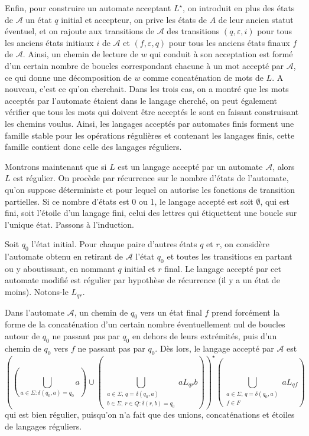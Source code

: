 \begin{preuve}
Enfin, pour construire un automate acceptant $L^\star$, on introduit en plus des états de $\mathcal{A}$ un état $q$ initial et accepteur, on prive les états de $A$ de leur ancien statut éventuel, et on rajoute aux transitions de $\mathcal{A}$ des transitions $(q,\varepsilon,i)$ pour tous les anciens états initiaux $i$ de $\mathcal{A}$ et $(f,\varepsilon,q)$ pour tous les anciens états finaux $f$ de $\mathcal{A}$. Ainsi, un chemin de lecture de $w$ qui conduit à son acceptation est formé d'un certain nombre de boucles correspondant chacune à un mot accepté par $\mathcal{A}$, ce qui donne une décomposition de $w$ comme concaténation de mots de $L$. A nouveau, c'est ce qu'on cherchait. Dans les trois cas, on a montré que les mots acceptés par l'automate étaient dans le langage cherché, on peut également vérifier que tous les mots qui doivent être acceptés le sont en faisant construisant les chemins voulus.
Ainsi, les langages acceptés par automates finis forment une famille stable pour les opérations régulières et contenant les langages finis, cette famille contient donc celle des langages réguliers.

Montrons maintenant que si $L$ est un langage accepté par un automate $\mathcal{A}$, alors $L$ est régulier. On procède par récurrence sur le nombre d'états de l'automate, qu'on suppose déterministe et pour lequel on autorise les fonctions de transition partielles. Si ce nombre d'états est 0 ou 1, le langage accepté est soit $\emptyset$, qui est fini, soit l'étoile d'un langage fini, celui des lettres qui étiquettent une boucle sur l'unique état. Passons à l'induction.

Soit $q_0$ l'état initial. Pour chaque paire d'autres états $q$ et $r$, on considère l'automate obtenu en retirant de $\mathcal{A}$ l'état $q_0$ et toutes les transitions en partant ou y aboutissant, en nommant $q$ initial et $r$ final. Le langage accepté par cet automate modifié est régulier par hypothèse de récurrence (il y a un état de moins). Notons-le $L_{qr}$.

Dans l'automate $\mathcal{A}$, un chemin de $q_0$ vers un état final $f$ prend forcément la forme de la  concaténation d'un certain nombre éventuellement nul de boucles autour de $q_0$ ne passant pas par $q_0$ en dehors de leurs extrémités, puis d'un chemin de $q_0$ vers $f$ ne passant pas par $q_0$. Dès lors, le langage accepté par $\mathcal{A}$ est
\[
\left( (\bigcup_{a\in\Sigma : \delta(q_0,a)=q_0} a) \cup
(\bigcup_{\substack{a\in\Sigma,\,q=\delta(q_0,a)\\ b\in \Sigma,\, r\in Q: \delta(r,b)=q_0}} aL_{qr}b)
\right) ^\star
\left(
\bigcup_{\substack{a\in\Sigma,\, q=\delta(q_0,a)\\ f\in F}} aL_{qf}
\right)
\]
qui est bien régulier, puisqu'on n'a fait que des unions, concaténations et étoiles de langages réguliers.
\end{preuve}

